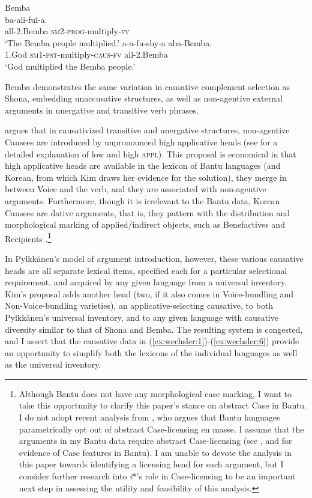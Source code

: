 \documentclass[output=paper,modfonts,nonflat,colorlinks,citecolor=brown]{langsci/langscibook}
\begin{document}
\ea\label{ex:wechsler:6}
Bemba \citep[155]{Givón1969}\\
\ea
{}  {{ba-ali-ful-a}}.  \\
 {all-2.Bemba}   {\textsc{sm2}{}-\textsc{prog}{}-multiply-\textsc{fv}}  \\
\glt `The Bemba people multiplied.'
\ex
{}  {{a-a-fu-shy-a} }  {{aba-Bemba}}.\\
1.God  {\textsc{sm1-pst}{}-multiply-\textsc{caus}{}-\textsc{fv}}  {all-2.Bemba}\\
\glt `God multiplied the Bemba people.'
\z
\z

Bemba demonstrates the same variation in causative complement selection as Shona, embedding unaccusative structures, as well as non-agentive external arguments in unergative and transitive verb phrases.


\citet{Kim2011thesis} argues that in causativized transitive and unergative structures, non-agentive Causees are introduced by unpronounced high applicative heads (see  for a detailed explanation of low and high \textsc{appl).} This proposal is economical in that high applicative heads are available in the lexicon of Bantu languages (and Korean, from which Kim draws her evidence for the solution), they merge in between Voice and the verb, and they are associated with non-agentive arguments. Furthermore, though it is irrelevant to the Bantu data, Korean Causees are dative arguments, that is, they pattern with the distribution and morphological marking of applied/indirect objects, such as Benefactives and Recipients \citep{Kim2011thesis}.\footnote{{Although Bantu does not have any morphological case marking, I want to take this opportunity to clarify this paper's stance on abstract Case in Bantu. I do not adopt recent analysis from} {\citet{Diercks2012}, who argues that Bantu languages parametrically opt out of abstract Case-licensing en masse. I assume that the arguments in my Bantu data require abstract Case-licensing (see} \citealt{vanderWal2015,SheehanvanderWal2016,Halpert2012}, and \citealt{Wechsler2014,Wechsler2016} for evidence of Case features in Bantu). I am unable to devote the analysis in this paper towards identifying a licensing head for each argument, but I consider further research into \textit{i}*’s role in Case-licensing to be an important next step in assessing the utility and feasibility of this analysis.}


In Pylkkänen’s model of argument introduction, however, these various causative heads are all separate lexical items, specified each for a particular selectional requirement, and acquired by any given language from a universal inventory. Kim’s proposal adds another head (two, if it also comes in Voice-bundling and Non-Voice-bundling varieties), an applicative-selecting causative, to both Pylkkänen’s universal inventory, and to any given language with causative diversity similar to that of Shona and Bemba. The resulting system is congested, and I assert that the causative data in (\ref{ex:wechsler:1})-(\ref{ex:wechsler:6}) provide an opportunity to simplify both the lexicons of the individual languages as well as the universal inventory.
\end{document}
